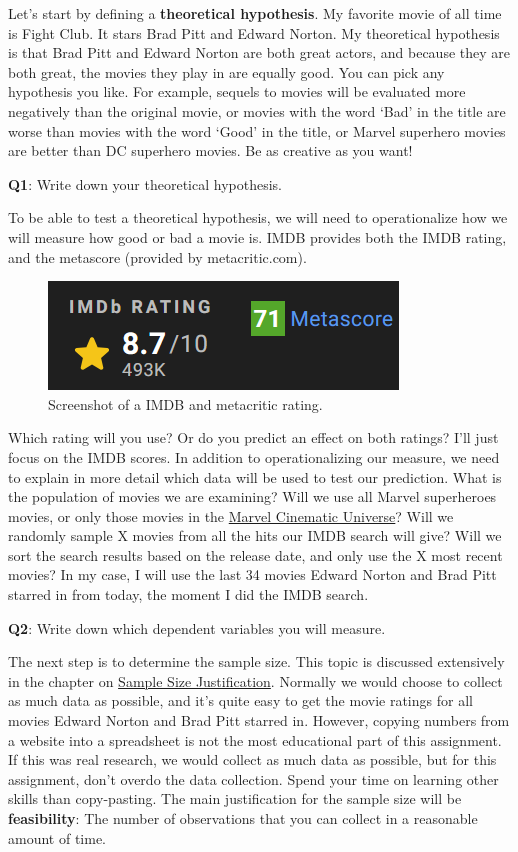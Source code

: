 \documentclass[
  oneside]{book}
\begin{document}
Let's start by defining a \textbf{theoretical hypothesis}. My favorite movie of all time is Fight Club. It stars Brad Pitt and Edward Norton. My theoretical hypothesis is that Brad Pitt and Edward Norton are both great actors, and because they are both great, the movies they play in are equally good. You can pick any hypothesis you like. For example, sequels to movies will be evaluated more negatively than the original movie, or movies with the word `Bad' in the title are worse than movies with the word `Good' in the title, or Marvel superhero movies are better than DC superhero movies. Be as creative as you want!

\textbf{Q1}: Write down your theoretical hypothesis.

To be able to test a theoretical hypothesis, we will need to operationalize how we will measure how good or bad a movie is. IMDB provides both the IMDB rating, and the metascore (provided by metacritic.com).

\begin{figure}

{\centering \includegraphics[width=0.4\linewidth]{images/imdbrating} 

}

\caption{Screenshot of a IMDB and metacritic rating.}\label{fig:imdbrating}
\end{figure}

Which rating will you use? Or do you predict an effect on both ratings? I'll just focus on the IMDB scores. In addition to operationalizing our measure, we need to explain in more detail which data will be used to test our prediction. What is the population of movies we are examining? Will we use all Marvel superheroes movies, or only those movies in the \href{https://en.wikipedia.org/wiki/List_of_Marvel_Cinematic_Universe_films}{Marvel Cinematic Universe}? Will we randomly sample X movies from all the hits our IMDB search will give? Will we sort the search results based on the release date, and only use the X most recent movies? In my case, I will use the last 34 movies Edward Norton and Brad Pitt starred in from today, the moment I did the IMDB search.

\textbf{Q2}: Write down which dependent variables you will measure.

The next step is to determine the sample size. This topic is discussed extensively in the chapter on \protect\hyperlink{power}{Sample Size Justification}. Normally we would choose to collect as much data as possible, and it's quite easy to get the movie ratings for all movies Edward Norton and Brad Pitt starred in. However, copying numbers from a website into a spreadsheet is not the most educational part of this assignment. If this was real research, we would collect as much data as possible, but for this assignment, don't overdo the data collection. Spend your time on learning other skills than copy-pasting. The main justification for the sample size will be \textbf{feasibility}: The number of observations that you can collect in a reasonable amount of time.
\end{document}
